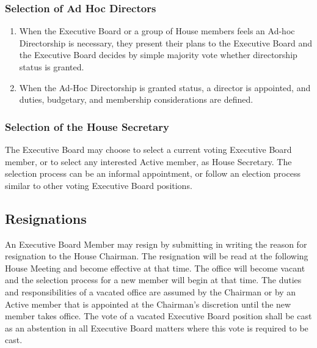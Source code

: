 \documentclass{article}
\newcommand{\asection}[1]{\subsection{#1} \label{#1}}
\newcommand{\asubsection}[1]{\subsubsection{#1} \label{#1}}
\begin{document}
\asubsection{Selection of Ad Hoc Directors}
\begin{enumerate}
	\item When the Executive Board or a group of House members feels an Ad-hoc Directorship is necessary, they present their plans to the Executive Board and the Executive Board decides by simple majority vote whether directorship status is granted.
	\item When the Ad-Hoc Directorship is granted status, a director is appointed, and duties, budgetary, and membership considerations are defined.
\end{enumerate}
\asubsection{Selection of the House Secretary}
The Executive Board may choose to select a current voting Executive Board member, or to select any interested Active member, as House Secretary. The selection process can be an informal appointment, or follow an election process similar to other voting Executive Board positions.

\asection{Resignations}
An Executive Board Member may resign by submitting in writing the reason for resignation to the House Chairman. The resignation will be read at the following House Meeting and become effective at that time. The office will become vacant and the selection process for a new member will begin at that time. The duties and responsibilities of a vacated office are assumed by the Chairman or by an Active member that is appointed at the Chairman’s discretion until the new member takes office. The vote of a vacated Executive Board position shall be cast as an abstention in all Executive Board matters where this vote is required to be cast.
\end{document}

